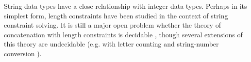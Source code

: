 

 
String data types have a close relationship with integer data types. Perhaps in its simplest form, 
length constraints have been studied in the context of string constraint solving. It is still a major open problem whether the theory of concatenation with length constraints is decidable \cite{Vijay-length}, though  several extensions of this 
theory are undecidable (e.g. with letter counting \cite{buchi} and
string-number conversion \cite{GB16}). 


%




